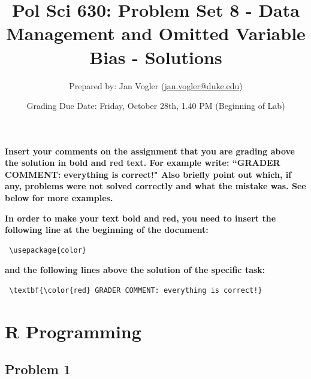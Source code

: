 \documentclass[12pt]{article}\usepackage[]{graphicx}\usepackage[]{color}
\begin{document}
\title{Pol Sci 630: Problem Set 8 - Data Management and Omitted Variable Bias - Solutions}

\author{Prepared by: Jan Vogler (\href{mailto:jan.vogler@duke.edu}{jan.vogler@duke.edu})}

\date{Grading Due Date: Friday, October 28th, 1.40 PM (Beginning of Lab)}
 
\maketitle



\textbf{\color{red} Insert your comments on the assignment that you are grading above the solution in bold and red text. For example write: ``GRADER COMMENT: everything is correct!" Also briefly point out which, if any, problems were not solved correctly and what the mistake was. See below for more examples.}

\bigskip

\textbf{In order to make your text bold and red, you need to insert the following line at the beginning of the document:}

\begin{verbatim} \usepackage{color} \end{verbatim}

\textbf{and the following lines above the solution of the specific task:}

\begin{verbatim} \textbf{\color{red} GRADER COMMENT: everything is correct!} \end{verbatim}



\pagebreak

\section*{R Programming}

\subsection*{Problem 1}
\end{document}

